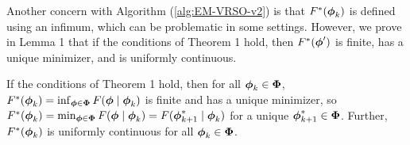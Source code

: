Another concern with Algorithm (\ref{alg:EM-VRSO-v2}) is that $F^{*}(\boldsymbol{\phi}_{k})$ is defined using an infimum, which can be problematic in some settings. However, we prove in Lemma 1 that if the conditions of Theorem 1 hold, then $F^*(\boldsymbol{\phi}')$ is finite, has a unique minimizer, and is uniformly continuous.

\begin{lemma}
    If the conditions of Theorem 1 hold, then for all $\boldsymbol{\phi}_k \in \boldsymbol{\Phi}$, $F^{*}(\boldsymbol{\phi}_k) = \inf_{\boldsymbol{\phi} \in \boldsymbol{\Phi}} F(\boldsymbol{\phi} \mid \boldsymbol{\phi}_k)$ is finite and has a unique minimizer, so $F^*(\boldsymbol{\phi}_k) = \min_{\boldsymbol{\phi} \in \boldsymbol{\Phi}} F(\boldsymbol{\phi} \mid \boldsymbol{\phi}_k) = F(\boldsymbol{\phi}_{k+1}^* \mid \boldsymbol{\phi}_k)$ for a unique $\boldsymbol{\phi}_{k+1}^* \in \boldsymbol{\Phi}$. Further, $F^*(\boldsymbol{\phi}_k)$ is uniformly continuous for all $\boldsymbol{\phi}_k \in \boldsymbol{\Phi}$.
\end{lemma}


